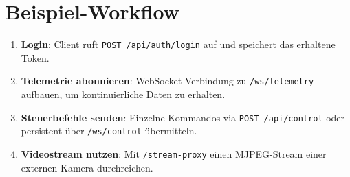 \documentclass[a4paper,11pt]{article}
\begin{document}
\section{Beispiel-Workflow}
\begin{enumerate}
  \item \textbf{Login}: Client ruft \texttt{POST /api/auth/login} auf und speichert das erhaltene Token.
  \item \textbf{Telemetrie abonnieren}: WebSocket-Verbindung zu \texttt{/ws/telemetry} aufbauen, um kontinuierliche Daten zu erhalten.
  \item \textbf{Steuerbefehle senden}: Einzelne Kommandos via \texttt{POST /api/control} oder persistent über \texttt{/ws/control} übermitteln.
  \item \textbf{Videostream nutzen}: Mit \texttt{/stream-proxy} einen MJPEG-Stream einer externen Kamera durchreichen.
\end{enumerate}
\end{document}
